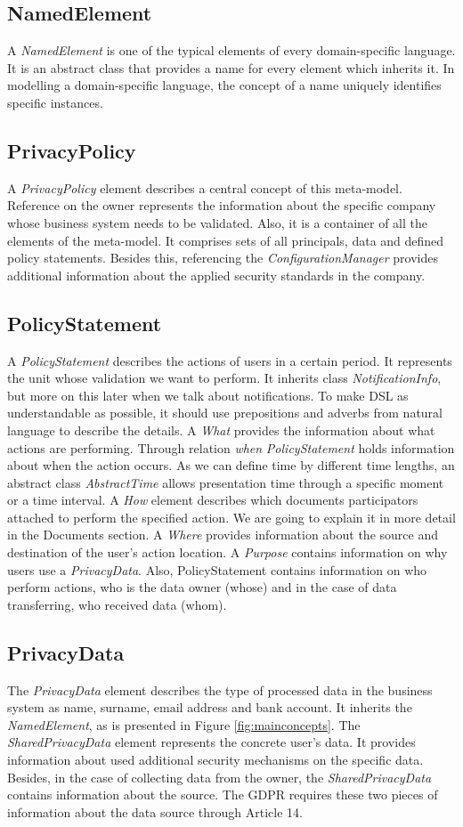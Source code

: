 \documentclass[11pt,english]{article}
\begin{document}
\subsection{NamedElement}
A \emph{NamedElement} is one of the typical elements of every domain-specific language. It is an abstract class that provides a name for every element which inherits it. In modelling a domain-specific language, the concept of a name uniquely identifies specific instances.
\subsection{PrivacyPolicy}
A \emph{PrivacyPolicy} element describes a central concept of this meta-model. Reference on the owner represents the information about the specific company whose business system needs to be validated. Also, it is a container of all the elements of the meta-model. It comprises sets of all principals, data and defined policy statements. Besides this, referencing the \emph{ConfigurationManager} provides additional information about the applied security standards in the company.
\subsection{PolicyStatement}
A \emph{PolicyStatement} describes the actions of users in a certain period. It represents the unit whose validation we want to perform. It inherits class \emph{NotificationInfo}, but more on this later when we talk about notifications. To make DSL as understandable as possible, it should use prepositions and adverbs from natural language to describe the details. A \emph{What} provides the information about what actions are performing. Through relation \emph{when} \emph{PolicyStatement} holds information about when the action occurs. As we can define time by different time lengths, an abstract class \emph{AbstractTime} allows presentation time through a specific moment or a time interval. A \emph{How} element describes which documents participators attached to perform the specified action. We are going to explain it in more detail in the Documents section. A \emph{Where} provides information about the source and destination of the user's action location. A \emph{Purpose} contains information on why users use a \emph{PrivacyData}. Also, PolicyStatement contains information on who perform actions, who is the data owner (whose) and in the case of data transferring, who received data (whom).
\subsection{PrivacyData}
The \emph{PrivacyData} element describes the type of processed data in the business system as name, surname, email address and bank account. It inherits the \emph{NamedElement}, as is presented in Figure \ref{fig:mainconcepts}. The \emph{SharedPrivacyData} element represents the concrete user's data. It provides information about used additional security mechanisms on the specific data. Besides, in the case of collecting data from the owner, the \emph{SharedPrivacyData} contains information about the source. The GDPR requires these two pieces of information about the data source through Article 14.
\end{document}
